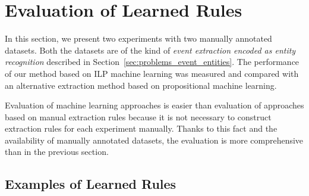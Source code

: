 
\section{Evaluation of Learned Rules} \label{sec:learning_eval}

In this section, we present two experiments with two manually annotated datasets. Both the datasets are of the kind of \emph{event extraction encoded as entity recognition} described in Section~\ref{sec:problems_event_entities}. The performance of our method based on ILP machine learning was measured and compared with an alternative extraction method based on propositional machine learning.

Evaluation of machine learning approaches is easier than evaluation of approaches based on manual extraction rules because it is not necessary to construct extraction rules for each experiment manually. Thanks to this fact and the availability of manually annotated datasets, the evaluation is more comprehensive than in the previous section.

\subsection{Examples of Learned Rules}

